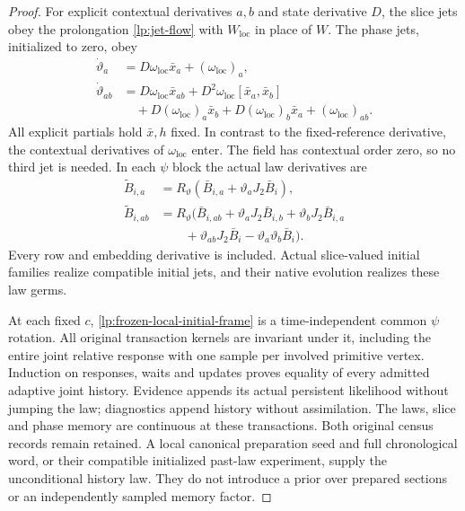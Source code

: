 \begin{proof}
For explicit contextual derivatives $a,b$ and state derivative $D$, the slice jets obey the prolongation \cref{lp:jet-flow} with $W_{\mathrm{loc}}$ in place of $W$. The phase jets, initialized to zero, obey
\begin{equation}
 \begin{aligned}
 \dot\vartheta_a&=D\omega_{\mathrm{loc}}\bar x_a+(\omega_{\mathrm{loc}})_a,\\
 \dot\vartheta_{ab}&=D\omega_{\mathrm{loc}}\bar x_{ab}
 +D^2\omega_{\mathrm{loc}}[\bar x_a,\bar x_b]\\
 &\quad+D(\omega_{\mathrm{loc}})_a\bar x_b
 +D(\omega_{\mathrm{loc}})_b\bar x_a+(\omega_{\mathrm{loc}})_{ab}.
 \end{aligned}
 \label{lp:causal-phase-jets}
\end{equation}
All explicit partials hold $\bar x,h$ fixed. In contrast to the fixed-reference derivative, the contextual derivatives of $\omega_{\mathrm{loc}}$ enter. The field has contextual order zero, so no third jet is needed. In each $\psi$ block the actual law derivatives are
\begin{equation}
 \begin{aligned}
 \widetilde B_{i,a}&=R_\vartheta(\bar B_{i,a}+\vartheta_aJ_2\bar B_i),\\
 \widetilde B_{i,ab}&=R_\vartheta\bigl(\bar B_{i,ab}
 +\vartheta_aJ_2\bar B_{i,b}+\vartheta_bJ_2\bar B_{i,a}\\
 &\qquad+\vartheta_{ab}J_2\bar B_i-\vartheta_a\vartheta_b\bar B_i\bigr).
 \end{aligned}
 \label{lp:causal-law-jets}
\end{equation}
Every row and embedding derivative is included. Actual slice-valued initial families realize compatible initial jets, and their native evolution realizes these law germs.

At each fixed $c$, \cref{lp:frozen-local-initial-frame} is a time-independent common $\psi$ rotation. All original transaction kernels are invariant under it, including the entire joint relative response with one sample per involved primitive vertex. Induction on responses, waits and updates proves equality of every admitted adaptive joint history. Evidence appends its actual persistent likelihood without jumping the law; diagnostics append history without assimilation. The laws, slice and phase memory are continuous at these transactions. Both original census records remain retained. A local canonical preparation seed and full chronological word, or their compatible initialized past-law experiment, supply the unconditional history law. They do not introduce a prior over prepared sections or an independently sampled memory factor.
\end{proof}

